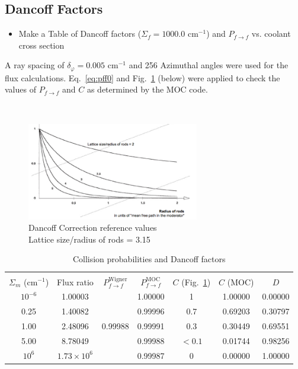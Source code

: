 \documentclass[12pt]{article}
\begin{document}
\subsection{Dancoff Factors}\label{sec:dancofffactoresults}

\begin{itemize}
\item Make a Table of Dancoff factors ($\Sigma_f = 1000.0 \text{ cm}^{-1}$) and $P_{f \rightarrow f} $ vs. coolant cross section
\end{itemize}

A ray spacing of $\delta_\varphi = 0.005 \text{ cm}^{-1}$ and 256 Azimuthal angles were used for the flux calculations. Eq.~\ref{eq:pff0} and Fig.~\ref{fig:hebert} (below) were applied to check the values of $P_{f \rightarrow f}$ and $C$ as determined by the MOC code. 

$ $

\begin{figure}[h]
\centering
\includegraphics[width=0.67\textwidth]{figs/Graph.png}
\caption{Dancoff Correction reference values \\
Lattice size/radius of rods = 3.15}
\label{fig:hebert}
\end{figure}

\begin{table}[H]
\centering
\caption{Collision probabilities and Dancoff factors}
\label{tab:prob2}
\begin{tabular}{c|c|c|c|c|c|c}
\hline
& & & & &\\
$\Sigma_m$ (cm$^{-1}$) & Flux ratio &
$P_{f \rightarrow f}^\text{Wigner}$ &
$P_{f \rightarrow f}^\text{MOC}$ &
$C$ (Fig.~\ref{fig:hebert}) & 
$C$ (MOC) & $D$ \\
	\hline \hline
$10^{-6}$	&	1.00003	&			&	1.00000	&	1		&	1.00000	&	0.00000	\\
0.25		&	1.40082	&			&	0.99996	&	0.7		&	0.69203	&	0.30797	\\
1.00		&	2.48096	&	0.99988	&	0.99991	&	0.3		&	0.30449	&	0.69551	\\
5.00		&	8.78049	&  &	0.99988	& $< 0.1$\hspace{12pt}	&	0.01744	&	0.98256	\\
$10^6$		& $1.73\times10^6$	&	&	0.99987	&	0	&	0.00000	&	1.00000	\\
\end{tabular}
\end{table}
\end{document}
